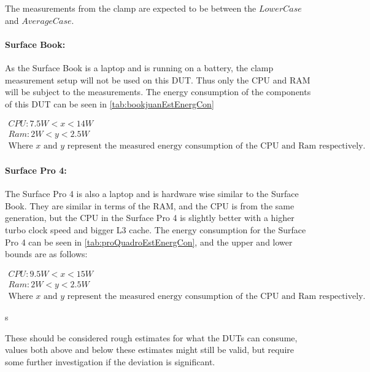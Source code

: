 The measurements from the clamp are expected to be between the $LowerCase$ and $AverageCase$.

\paragraph{Surface Book:} As the Surface Book is a laptop and is running on a battery, the clamp measurement setup will not be used on this DUT. Thus only the CPU and RAM will be subject to the measurements. The energy consumption of the components of this DUT can be seen in \cref{tab:bookjuanEstEnergCon}

\begin{gather*}
    CPU: 7.5W < x < 14W \\
    Ram: 2W < y < 2.5W \\
    \text{Where $x$ and $y$ represent the measured energy consumption of the CPU and Ram respectively.}
\end{gather*}




\paragraph{Surface Pro 4:} The Surface Pro 4 is also a laptop and is hardware wise similar to the Surface Book. They are similar in terms of the RAM, and the CPU is from the same generation, but the CPU in the Surface Pro 4 is slightly better with a higher turbo clock speed and bigger L3 cache. The energy consumption for the Surface Pro 4 can be seen in \cref{tab:proQuadroEstEnergCon}, and the upper and lower bounds are as follows:

\begin{gather*}
    CPU: 9.5W < x < 15W \\
    Ram: 2W < y < 2.5W \\
    \text{Where $x$ and $y$ represent the measured energy consumption of the CPU and Ram respectively.}
\end{gather*}

s

These should be considered rough estimates for what the DUTs can consume, values both above and below these estimates might still be valid, but require some further investigation if the deviation is significant.